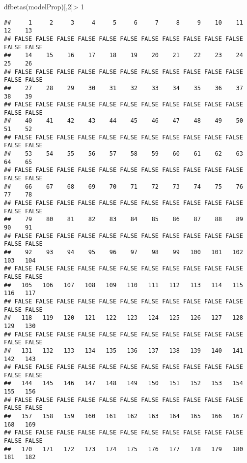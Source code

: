 \documentclass[
]{article}
\newenvironment{Shaded}{\begin{snugshade}}{\end{snugshade}}
\newcommand{\DecValTok}[1]{\textcolor[rgb]{0.00,0.00,0.81}{#1}}
\newcommand{\FunctionTok}[1]{\textcolor[rgb]{0.00,0.00,0.00}{#1}}
\newcommand{\NormalTok}[1]{#1}
\newcommand{\SpecialCharTok}[1]{\textcolor[rgb]{0.00,0.00,0.00}{#1}}
\begin{document}
\begin{Shaded}
\begin{Highlighting}[]
\FunctionTok{dfbetas}\NormalTok{(modelProp)[,}\DecValTok{2}\NormalTok{]}\SpecialCharTok{\textgreater{}} \DecValTok{1}
\end{Highlighting}
\end{Shaded}

\begin{verbatim}
##     1     2     3     4     5     6     7     8     9    10    11    12    13 
## FALSE FALSE FALSE FALSE FALSE FALSE FALSE FALSE FALSE FALSE FALSE FALSE FALSE 
##    14    15    16    17    18    19    20    21    22    23    24    25    26 
## FALSE FALSE FALSE FALSE FALSE FALSE FALSE FALSE FALSE FALSE FALSE FALSE FALSE 
##    27    28    29    30    31    32    33    34    35    36    37    38    39 
## FALSE FALSE FALSE FALSE FALSE FALSE FALSE FALSE FALSE FALSE FALSE FALSE FALSE 
##    40    41    42    43    44    45    46    47    48    49    50    51    52 
## FALSE FALSE FALSE FALSE FALSE FALSE FALSE FALSE FALSE FALSE FALSE FALSE FALSE 
##    53    54    55    56    57    58    59    60    61    62    63    64    65 
## FALSE FALSE FALSE FALSE FALSE FALSE FALSE FALSE FALSE FALSE FALSE FALSE FALSE 
##    66    67    68    69    70    71    72    73    74    75    76    77    78 
## FALSE FALSE FALSE FALSE FALSE FALSE FALSE FALSE FALSE FALSE FALSE FALSE FALSE 
##    79    80    81    82    83    84    85    86    87    88    89    90    91 
## FALSE FALSE FALSE FALSE FALSE FALSE FALSE FALSE FALSE FALSE FALSE FALSE FALSE 
##    92    93    94    95    96    97    98    99   100   101   102   103   104 
## FALSE FALSE FALSE FALSE FALSE FALSE FALSE FALSE FALSE FALSE FALSE FALSE FALSE 
##   105   106   107   108   109   110   111   112   113   114   115   116   117 
## FALSE FALSE FALSE FALSE FALSE FALSE FALSE FALSE FALSE FALSE FALSE FALSE FALSE 
##   118   119   120   121   122   123   124   125   126   127   128   129   130 
## FALSE FALSE FALSE FALSE FALSE FALSE FALSE FALSE FALSE FALSE FALSE FALSE FALSE 
##   131   132   133   134   135   136   137   138   139   140   141   142   143 
## FALSE FALSE FALSE FALSE FALSE FALSE FALSE FALSE FALSE FALSE FALSE FALSE FALSE 
##   144   145   146   147   148   149   150   151   152   153   154   155   156 
## FALSE FALSE FALSE FALSE FALSE FALSE FALSE FALSE FALSE FALSE FALSE FALSE FALSE 
##   157   158   159   160   161   162   163   164   165   166   167   168   169 
## FALSE FALSE FALSE FALSE FALSE FALSE FALSE FALSE FALSE FALSE FALSE FALSE FALSE 
##   170   171   172   173   174   175   176   177   178   179   180   181   182 

\end{verbatim}
\end{document}

